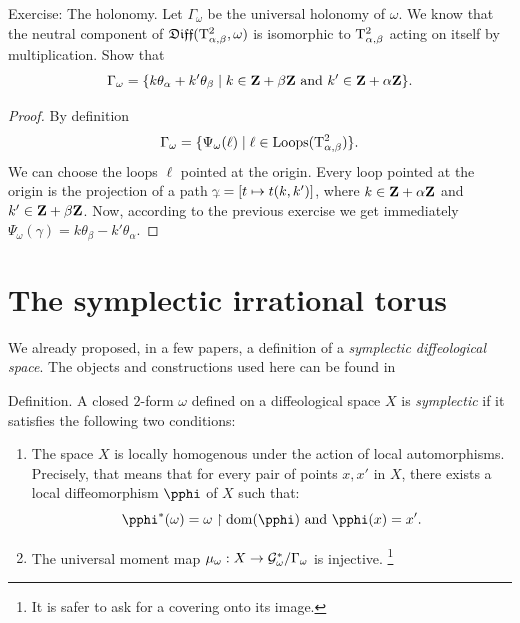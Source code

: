 \begin{Article}{Exercise: The holonomy.}{}
  Let $\Gamma_\omega$ be the universal holonomy of $\omega$.
  We know that the neutral component of $\mathfrak{Diff}(\mathrm{T}^2_{\alpha,\beta},\omega)$ is isomorphic to $\mathrm{T}^2_{\alpha,\beta}$ acting on itself by multiplication.
  Show that
  $$%
    \Gamma_\omega = \{k\theta_\alpha + k' \theta_\beta \mid k \in \ZZ + \beta\ZZ \mbox{ and } k' \in \ZZ + \alpha \ZZ \}.
    $$%
\end{Article}

\begin{proof}
  By definition
  $$%
    \Gamma_\omega = \{ \Psi_\omega(\ell) \mid \ell \in \Loops(\Torus^2_{\alpha,\beta})\}.
    $$%
  We can choose the loops $\ell$ pointed at the origin.
  Every loop pointed at the origin is the projection of a path $\bargamma = [t \mapsto t(k,k')]$,
  where $k \in \mathbf{Z}+\alpha \mathbf{Z}$ and $k' \in \mathbf{Z} + \beta \mathbf{Z}$.
  Now,
  according to the previous exercise we get immediately $\Psi_\omega(\gamma) = k\theta_\beta  -k'\theta_\alpha$.
\end{proof}


\section{The symplectic irrational torus}

We already proposed,
in a few papers,
a definition of a {\em symplectic diffeological space}.
The objects and constructions used here can be found in \cite{PIZ10}

\begin{Article}{Definition.}{\it} A closed $2$-form $\omega$ defined on a diffeological space $X$ is \emph{symplectic} if it satisfies the following two conditions:
  \begin{enumerate}
    \item The space $X$ is locally homogenous under the action of local automorphisms.
    Precisely,
    that means that for every pair of points $x,x'$ in $X$,
    there exists a local diffeomorphism $\pphi$ of $X$ such that:
    $$%
      \pphi^*(\omega) = \omega \restriction \Domain(\pphi) \SpacedText{and} \pphi(x) = x'.
      $$%
    \item The universal moment map $\mu_\omega : X \to \mathcal{G}^*_\omega/\Gamma_\omega$ is injective.%
    \footnote{It is safer to ask for a covering onto its image.}
  \end{enumerate}
\end{Article}

